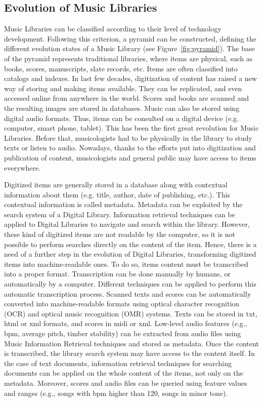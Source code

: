 \subsection{Evolution of Music Libraries}

Music Libraries can be classified according to their level of technology development. Following this criterion, a pyramid can be constructed, defining the different evolution states of a Music Library (see Figure~\ref{fig:pyramid}). The base of the pyramid represents traditional libraries, where items are physical, such as books, scores, manuscripts, slate records, etc. Items are often classified into catalogs and indexes. In last few decades, digitization of content has raised a new way of storing and making items available. They can be replicated, and even accessed online from anywhere in the world. Scores and books are scanned and the resulting images are stored in databases. Music can also be stored using digital audio formats. Thus, items can be consulted on a digital device (e.g. computer, smart phone, tablet). This has been the first great revolution for Music Libraries. Before that, musicologists had to be physically in the library to study texts or listen to audio. Nowadays, thanks to the efforts put into digitization and publication of content, musicologists and general public may have access to items everywhere.

Digitized items are generally stored in a database along with contextual information about them (e.g. title, author, date of publishing, etc.). This contextual information is called metadata. Metadata can be exploited by the search system of a Digital Library. Information retrieval techniques can be applied to Digital Libraries to navigate and search within the library. However, these kind of digitized items are not readable by the computer, so it is not possible to perform searches directly on the content of the item. Hence, there is a need of a further step in the evolution of Digital Libraries, transforming digitized items into machine-readable ones. To do so, items content must be transcribed into a proper format. Transcription can be done manually by humans, or automatically by a computer. Different techniques can be applied to perform this automatic transcription process. Scanned texts and scores can be automatically converted into machine-readable formats using optical character recognition (OCR) and optical music recognition (OMR) systems. Texts can be stored in txt, html or xml formats, and scores in midi or xml. Low-level audio features (e.g., bpm, average pitch, timber stability) can be extracted from audio files using Music Information Retrieval techniques and stored as metadata. Once the content is transcribed, the library search system may have access to the content itself. In the case of text documents, information retrieval techniques for searching documents can be applied on the whole content of the items, not only on the metadata. Moreover, scores and audio files can be queried using feature values and ranges (e.g., songs with bpm higher than 120, songs in minor tone). 

